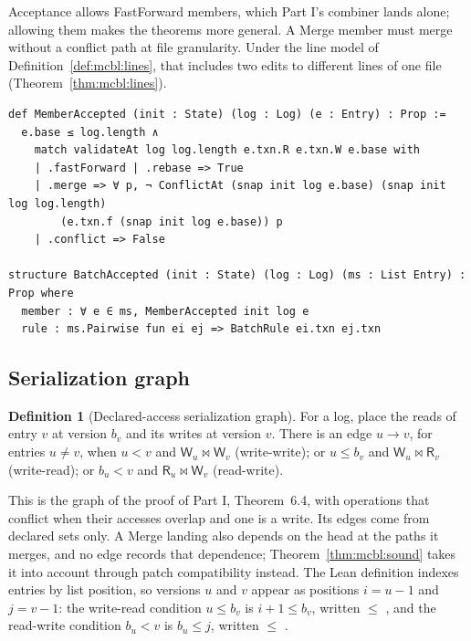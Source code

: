 \documentclass[11pt,letterpaper]{article}
\theoremstyle{definition}
\newtheorem{definition}[theorem]{Definition}
\theoremstyle{remark}
\newcommand{\R}{\mathsf{R}}
\newcommand{\W}{\mathsf{W}}
\newcommand{\meets}{\bowtie}
\begin{document}
Acceptance allows FastForward members, which Part I's combiner lands alone; allowing them makes the theorems more general. A Merge member must merge without a conflict path at file granularity. Under the line model of Definition~\ref{def:mcbl:lines}, that includes two edits to different lines of one file (Theorem~\ref{thm:mcbl:lines}).

\begin{lstlisting}[language=Lean,caption={Accepted members and batches (\texttt{YonedaTx/Soundness.lean})},label={lst:mcbl:accepted}]
def MemberAccepted (init : State) (log : Log) (e : Entry) : Prop :=
  e.base ≤ log.length ∧
    match validateAt log log.length e.txn.R e.txn.W e.base with
    | .fastForward | .rebase => True
    | .merge => ∀ p, ¬ ConflictAt (snap init log e.base) (snap init log log.length)
        (e.txn.f (snap init log e.base)) p
    | .conflict => False

structure BatchAccepted (init : State) (log : Log) (ms : List Entry) : Prop where
  member : ∀ e ∈ ms, MemberAccepted init log e
  rule : ms.Pairwise fun ei ej => BatchRule ei.txn ej.txn
\end{lstlisting}

\subsection{Serialization graph}

\begin{definition}[Declared-access serialization graph]
\label{def:mcbl:sgraph}
For a log, place the reads of entry $v$ at version $b_v$ and its writes at version $v$. There is an edge $u\to v$, for entries $u\neq v$, when $u<v$ and $\W_u\meets\W_v$ (write-write); or $u\leq b_v$ and $\W_u\meets\R_v$ (write-read); or $b_u<v$ and $\R_u\meets\W_v$ (read-write).
\end{definition}

This is the graph of the proof of Part I, Theorem~6.4, with operations that conflict when their accesses overlap and one is a write. Its edges come from declared sets only. A Merge landing also depends on the head at the paths it merges, and no edge records that dependence; Theorem~\ref{thm:mcbl:sound} takes it into account through patch compatibility instead. The Lean definition indexes entries by list position, so versions $u$ and $v$ appear as positions $i=u-1$ and $j=v-1$: the write-read condition $u\leq b_v$ is $i+1\leq b_v$, written  $\leq$ , and the read-write condition $b_u<v$ is $b_u\leq j$, written  $\leq$ .
\end{document}
